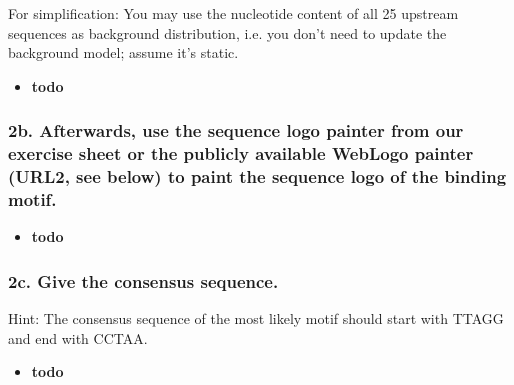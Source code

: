 \documentclass[a4paper,10pt,titlepage]{article}
\begin{document}
For simplification: You may use the nucleotide content of all 25 upstream sequences as background distribution, i.e. you don’t need to update the background model; assume it’s static.

\begin{itemize}
\item
\textbf{todo}
\end{itemize}

\subsubsection{2b. Afterwards, use the sequence logo painter from our exercise sheet or the publicly available WebLogo painter (URL2, see below) to paint the sequence logo of the binding motif.}

\begin{itemize}
\item
\textbf{todo}
\end{itemize}

\subsubsection{2c. Give the consensus sequence.}

Hint: The consensus sequence of the most likely motif should start with TTAGG and end with CCTAA.

\begin{itemize}
\item
\textbf{todo}
\end{itemize}
\end{document}
